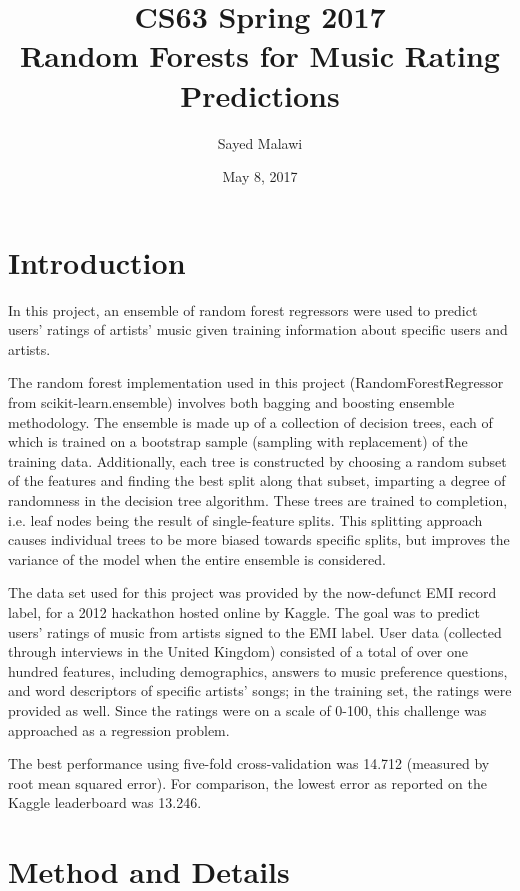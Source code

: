 \documentclass[11pt]{article}
\title{CS63 Spring 2017\\Random Forests for Music Rating Predictions}
\author{Sayed Malawi}
\date{May 8, 2017}
\begin{document}
	
	\maketitle
	
	\section{Introduction}
	
	In this project, an ensemble of random forest regressors were used to
	predict users' ratings of artists' music given training information
	about specific users and artists.
	
	The random forest implementation used in this project 
	(RandomForestRegressor from scikit-learn.ensemble) involves both
	bagging and boosting ensemble methodology. The ensemble is made up of
	a collection of decision trees, each of which is trained on a
	bootstrap sample (sampling with replacement) of the training data.
	Additionally, each tree is constructed by choosing a random subset
	of the features and finding the best split along that subset,
	imparting a degree of randomness in the decision tree algorithm.
	These trees are trained to completion, i.e. leaf nodes being the
	result of single-feature splits. This splitting approach causes
	individual trees to be more biased towards specific splits, but
	improves the variance of the model when the entire ensemble is
	considered.
	
	The data set used for this project was provided by the now-defunct
	EMI record label, for a 2012 hackathon hosted online by Kaggle. The
	goal was to predict users' ratings of music from artists signed to the
	EMI label. User data (collected through interviews in the United Kingdom)
	consisted of a total of over one hundred features,
	including demographics, answers to music
	preference questions, and word descriptors of specific artists' songs;
	in the training set, the ratings were provided as well. Since the ratings
	were on a scale of 0-100, this challenge was approached as a regression
	problem.
	
	The best performance using five-fold cross-validation was 14.712
	(measured by root mean squared error). For comparison, the lowest error
	as reported on the Kaggle leaderboard was 13.246.
	
	\section{Method and Details}
	
\end{document}
